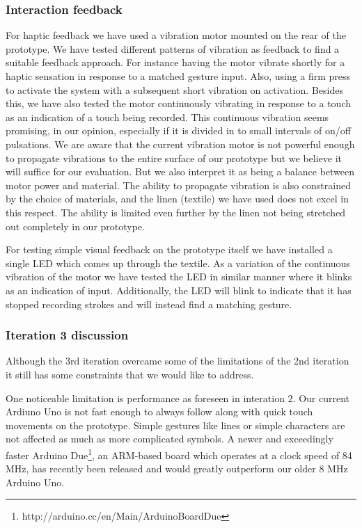 \subsubsection{Interaction feedback} 

For haptic feedback we have used a vibration motor mounted on the rear of the prototype.
We have tested different patterns of vibration as feedback to find a suitable feedback approach.
For instance having the motor vibrate shortly for a haptic sensation in response to a matched gesture input.
Also, using a firm press to activate the system with a subsequent short vibration on activation.
Besides this, we have also tested the motor continuously vibrating in response to a touch as an indication of a touch being recorded.
This continuous vibration seems promising, in our opinion, especially if it is divided in to small intervals of on/off pulsations.
We are aware that the current vibration motor is not powerful enough to propagate vibrations to the entire surface of our prototype but we believe it will suffice for our evaluation.
But we also interpret it as being a balance between motor power and material.
The ability to propagate vibration is also constrained by the choice of materials, and the linen (textile) we have used does not excel in this respect.
The ability is limited even further by the linen not being stretched out completely in our prototype.

For testing simple visual feedback on the prototype itself we have installed a single LED which comes up through the textile.
As a variation of the continuous vibration of the motor we have tested the LED in similar manner where it blinks as an indication of input.
Additionally, the LED will blink to indicate that it has stopped recording strokes and will instead find a matching gesture.

\subsubsection{Iteration 3 discussion} 

Although the 3rd iteration overcame some of the limitations of the 2nd iteration it still has some constraints that we would like to address.

One noticeable limitation is performance as foreseen in interation 2.
Our current Ardiuno Uno is not fast enough to always follow along with quick touch movements on the prototype.
Simple gestures like lines or simple characters are not affected as much as more complicated symbols.
A newer and exceedingly faster Arduino Due\footnote{http://arduino.cc/en/Main/ArduinoBoardDue}, an ARM-based board which operates at a clock speed of 84 MHz, has recently been released and would greatly outperform our older 8 MHz Arduino Uno.

